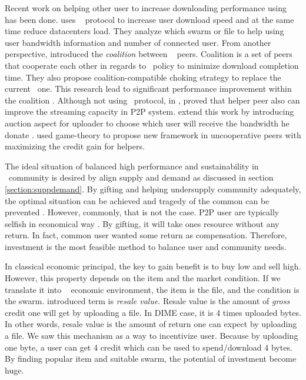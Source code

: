 Recent work on helping other user to increase downloading performance using \bt~ has been done. \citeauthor{2014:cloudseed:leon} uses \bt~ protocol to increase user download speed and at the same time reduce datacenters load. They analyze which swarm or file to help using user bandwidth information and number of connected user\cite{2014:cloudseed:leon}. From another perspective, \citeauthor{2015:coalitionbt:zhang} introduced the \textit{coalition} between \bt~ peers. Coalition is a set of peers that cooperate each other in regards to \bt~policy to minimize download completion time. They also propose coalition-compatible choking strategy to replace the current \bt~one. This research lead to significant performance improvement within the coalition \cite{2015:coalitionbt:zhang}. Although not using \bt~protocol, in \citeyear{2009:p2phelp:he}, \citeauthor{2009:p2phelp:he} proved that helper peer also can improve the streaming capacity in P2P system\cite{2009:p2phelp:he}. \citeauthor{2016:gameauctionp2pstream:mostafavi} extend this work by introducing auction aspect for uploader to choose which user will receive the bandwidth he donate \cite{2016:gameauctionp2pstream:mostafavi}. \citeauthor{2016:gameauctionp2pstream:mostafavi} used game-theory to propose new framework in uncooperative peers with maximizing the credit gain for helpers.

The ideal situation of balanced high performance and sustainability in \bt~community is desired by align supply and demand as discussed in section \ref{section:suppdemand}. By gifting and helping undersupply community adequately, the optimal situation can be achieved and tragedy of the common can be prevented \cite{2002:reputationtotragedy:milinski}. However, commonly, that is not the case. P2P user are typically selfish in economical way \cite{2014:userbehaviourprivate:jia}. By gifting, it will take ones resource without any return. In fact, common user wanted some return as compensation. Therefore, investment is the most feasible method to balance user and community needs.

In classical economic principal, the key to gain benefit is to buy low and sell high. However, this property depends on the item and the market condition. If we translate it into \bt~ economic environment, the item is the file, and the condition is the swarm. \citeauthor{2012:economicbt:kash} introduced term is \textit{resale value}. Resale value is the amount of \textit{gross} credit one will get by uploading a file. In DIME case, it is 4 times uploaded bytes. In other words, resale value is the amount of return one can expect by uploading a file. We saw this mechanism as a way to incentivize user. Because by uploading one byte, a user can get 4 credit which can be used to spend/download 4 bytes. By finding popular item and suitable swarm, the potential of investment become huge.

